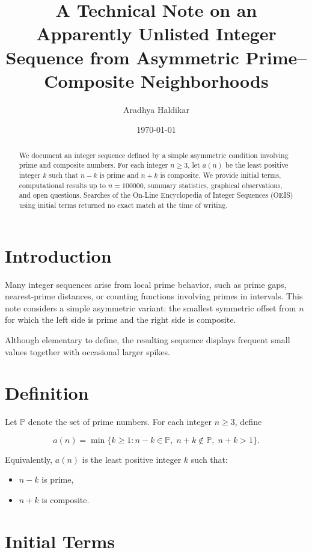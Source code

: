 \documentclass[11pt,a4paper]{article}
\title{A Technical Note on an Apparently Unlisted Integer Sequence from Asymmetric Prime--Composite Neighborhoods}
\author{Aradhya Haldikar}
\date{\today}
\begin{document}
\maketitle

\begin{abstract}
We document an integer sequence defined by a simple asymmetric condition involving prime and composite numbers. For each integer \(n \ge 3\), let \(a(n)\) be the least positive integer \(k\) such that \(n-k\) is prime and \(n+k\) is composite. We provide initial terms, computational results up to \(n=100000\), summary statistics, graphical observations, and open questions. Searches of the On-Line Encyclopedia of Integer Sequences (OEIS) using initial terms returned no exact match at the time of writing.
\end{abstract}

\section{Introduction}

Many integer sequences arise from local prime behavior, such as prime gaps, nearest-prime distances, or counting functions involving primes in intervals. This note considers a simple asymmetric variant: the smallest symmetric offset from \(n\) for which the left side is prime and the right side is composite.

Although elementary to define, the resulting sequence displays frequent small values together with occasional larger spikes.

\section{Definition}

Let \(\mathbb{P}\) denote the set of prime numbers. For each integer \(n \ge 3\), define

\[
a(n)=\min \{k \ge 1 : n-k \in \mathbb{P},\; n+k \notin \mathbb{P},\; n+k>1\}.
\]

Equivalently, \(a(n)\) is the least positive integer \(k\) such that:

\begin{itemize}
    \item \(n-k\) is prime,
    \item \(n+k\) is composite.
\end{itemize}

\section{Initial Terms}
\end{document}
